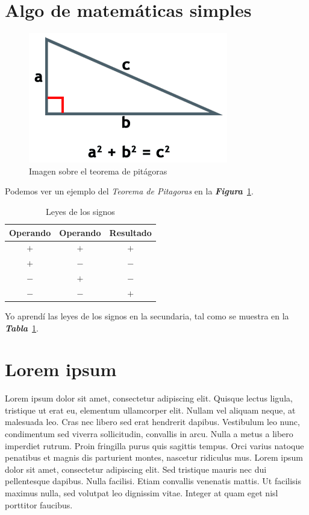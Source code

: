 \documentclass{book}
\begin{document}
\section{Algo de matemáticas simples}
\begin{figure}[h]
  \centering
  \includegraphics[scale=0.5]{IMG/pitagoras.png}
  \caption{Imagen sobre el teorema de pitágoras}
  \label{fig:pitagoras}
\end{figure}

Podemos ver un ejemplo del \emph{Teorema de Pitagoras} en la
\emph{\textbf{Figura}}~\ref{fig:pitagoras}.


\begin{table}[h]
  \centering
  \begin{tabular}{| c  c  c  |}
    \hline
    Operando & Operando & Resultado\\\hline
    $+$ & $+$ & $+$\\\hline
    $+$ & $-$ & $-$\\\hline
    $-$ & $+$ & $-$\\\hline
    $-$ & $-$ & $+$\\\hline    
  \end{tabular}
  \caption{Leyes de los signos}
  \label{tabla:leyes_signos}
\end{table}

Yo aprendí las leyes de los signos en la secundaria, tal como
se muestra en la \textbf{\emph{Tabla}}~\ref{tabla:leyes_signos}.



\section{Lorem ipsum}

Lorem ipsum dolor sit amet, consectetur adipiscing elit. Quisque lectus ligula,
tristique ut erat eu, elementum ullamcorper elit. Nullam vel aliquam neque, at
malesuada leo. Cras nec libero sed erat hendrerit dapibus. Vestibulum leo nunc,
condimentum sed viverra sollicitudin, convallis in arcu. Nulla a metus a libero
imperdiet rutrum. Proin fringilla purus quis sagittis tempus. Orci varius
natoque penatibus et magnis dis parturient montes, nascetur ridiculus mus. Lorem
ipsum dolor sit amet, consectetur adipiscing elit. Sed tristique mauris nec dui
pellentesque dapibus. Nulla facilisi. Etiam convallis venenatis mattis. Ut
facilisis maximus nulla, sed volutpat leo dignissim vitae. Integer at quam eget
nisl porttitor faucibus.
\end{document}
